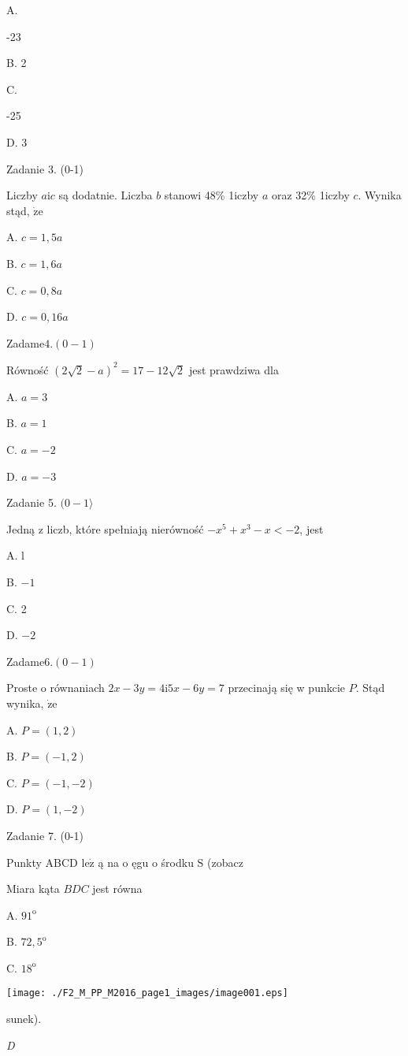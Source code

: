 \documentclass[a4paper,12pt]{article}
\begin{document}
A.

-23

B. 2

C.

-25

D. 3

Zadanie 3. (0-1)

Liczby $a\mathrm{i}c$ są dodatnie. Liczba $b$ stanowi 48\% 1iczby $a$ oraz 32\% 1iczby $c$. Wynika stąd, $\dot{\mathrm{z}}\mathrm{e}$

A. $c=1,5a$

B. $c=1,6a$

C. $c=0,8a$

D. $c=0,16a$

Zadam$\mathrm{e}4.(0-1)$

Równość $(2\sqrt{2}-a)^{2}=17-12\sqrt{2}$ jest prawdziwa dla

A. $a=3$

B. $a=1$

C. $a=-2$

D. $a=-3$

Zadanie 5. $(0-1\rangle$

Jedną z liczb, które spełniają nierówność $-x^{5}+x^{3}-x<-2$, jest

A. l

B. $-1$

C. 2

D. $-2$

Zadam$\mathrm{e}6.(0-1)$

Proste o równaniach $2x-3y=4\mathrm{i}5x-6y=7$ przecinają się w punkcie $P$. Stąd wynika, $\dot{\mathrm{z}}\mathrm{e}$

A. $P=(1,2)$

B. $P=(-1,2)$

C. $P=(-1,-2)$

D. $P=(1,-2)$

Zadanie 7. (0-1)

Punkty ABCD $\mathrm{l}\mathrm{e}\dot{\mathrm{z}}$ ą na o ęgu o środku $\mathrm{S}$ (zobacz

Miara kąta $BDC$ jest równa

A. $91^{\mathrm{o}}$

B. $72,5^{\mathrm{o}}$

C. $18^{\mathrm{o}}$
\begin{center}
\texttt{[image: ./F2\_M\_PP\_M2016\_page1\_images/image001.eps]}
\end{center}
sunek).

{\it D}
\end{document}
